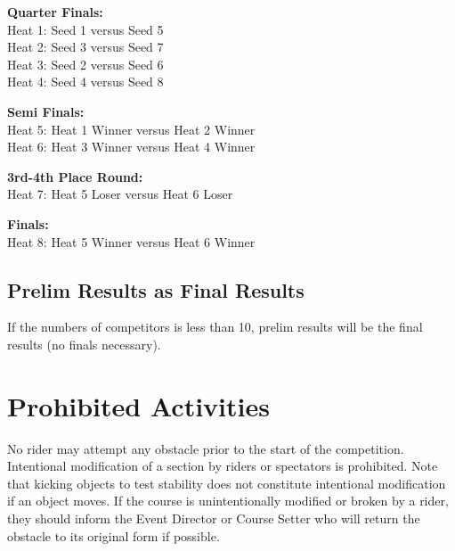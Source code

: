 \textbf{Quarter Finals:}\\
Heat 1: Seed 1 versus Seed 5\\
Heat 2: Seed 3 versus Seed 7\\
Heat 3: Seed 2 versus Seed 6\\
Heat 4: Seed 4 versus Seed 8

\textbf{Semi Finals:}\\
Heat 5: Heat 1 Winner versus Heat 2 Winner\\
Heat 6: Heat 3 Winner versus Heat 4 Winner

\textbf{3rd-4th Place Round:}\\
 Heat 7: Heat 5 Loser versus Heat 6 Loser

\textbf{Finals:}\\
Heat 8: Heat 5 Winner versus Heat 6 Winner

\subsection{Prelim Results as Final Results}

If the numbers of competitors is less than 10, prelim results will be the final results (no finals necessary).

\section{Prohibited Activities}
No rider may attempt any obstacle prior to the start of the competition.
Intentional modification of a section by riders or spectators is prohibited.
Note that kicking objects to test stability does not constitute intentional modification if an object moves.
If the course is unintentionally modified or broken by a rider, they should inform the Event Director or Course Setter who will return the obstacle to its original form if possible.
